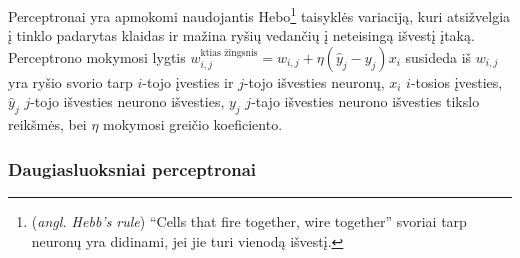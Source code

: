 \documentclass{VUMIFPSbakalaurinis}
\begin{document}
{	Perceptronai yra apmokomi naudojantis Hebo\footnote{(\textit{angl. Hebb's rule}) \enquote{Cells that fire together, wire together} svoriai tarp neuronų yra didinami, jei jie turi vienodą išvestį.} taisyklės variaciją, kuri atsižvelgia į tinklo padarytas klaidas ir mažina ryšių vedančių į neteisingą išvestį įtaką. Perceptrono mokymosi lygtis \(w_{i, j}^{\textrm{ktias žingsnis}} = w_{i, j} + \eta (\hat{y}_j - y_j)x_i\) susideda iš \(w_{i, j}\) yra ryšio svorio tarp \(i\)-tojo įvesties ir \(j\)-tojo išvesties neuronų, \(x_i\) \(i\)-tosios įvesties, \(\hat{y}_j\) \(j\)-tojo išvesties neurono išvesties, \(y_j\) \(j\)-tajo išvesties neurono išvesties tikslo reikšmės, bei \(\eta\) mokymosi greičio koeficiento.\par
}
\subsubsection{Daugiasluoksniai perceptronai}\label{subsubsec:mlp}
\end{document}
